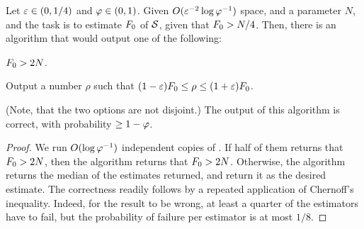 \begin{lemma}
    Let ${\varepsilon} \in (0,1/4)$ and $\varphi \in (0,1)$.  Given
    $O({\varepsilon}^{-2} \log \varphi^{-1})$ space, and a parameter $N$, and
    the task is to estimate $F_0$ of $\mathcal{S}$, given that
    $F_0 > N/4$.  Then, there is an algorithm that would output one
    of the following:
    \begin{compactenumA}
        \smallskip%
        \item $F_0 > 2N$.
        \smallskip%
        \item Output a number $\rho$ such that
        $(1-{\varepsilon})F_0 \leq \rho \leq (1+{\varepsilon})F_0$.
    \end{compactenumA}
    \smallskip%
    (Note, that the two options are not disjoint.)  The output of this
    algorithm is correct, with probability $\geq 1- \varphi$.
\end{lemma}

\begin{proof}
    We run $O( \log \varphi^{-1})$ independent copies of
    . If half of them returns that $F_0 > 2N$, then
    the algorithm returns that $F_0 > 2N$. Otherwise, the algorithm
    returns the median of the estimates returned, and return it as the
    desired estimate. The correctness readily follows by a repeated
    application of Chernoff's inequality. Indeed, for the result to be
    wrong, at least a quarter of the estimators have to fail, but the
    probability of failure per estimator is at most $1/8$.
\end{proof}


